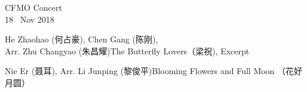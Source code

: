 \documentclass[letter,6pt,poets]{ConcProg}
\begin{document}
\begin{programme}{
    CFMO Concert
\\  {\normalsize 18 ~Nov 2018}
}
  \begin{part}[]
    \begin{composition}{He Zhaohao (何占豪), Chen Gang (陈刚), \\Arr. Zhu Changyao (朱昌耀)}{}{The Butterfly Lovers（梁祝), Excerpt}{}
    \end{composition}
    
    \begin{composition}{Nie Er (聂耳), Arr. Li Junping (黎俊平)}{}{Blooming Flowers and Full Moon （花好月圆）}{}      
    \end{composition}
    

\end{part}
\end{programme}
\end{document}
